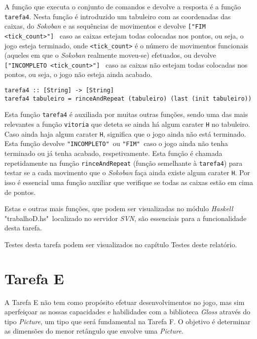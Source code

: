\documentclass[a4paper,12pt]{report}
\begin{document}
A função que executa o conjunto de comandos e devolve a resposta é a função {\footnotesize\tt tarefa4}. Nesta função é introduzido um tabuleiro com as coordenadas das caixas, do {\sl Sokoban} e as sequências de movimentos e devolve {\footnotesize\tt ["FIM <tick\_count>"] } caso as caixas estejam todas colocadas nos pontos, ou seja, o jogo esteja terminado, onde {\footnotesize\tt <tick\_count>} é o número de movimentos funcionais (aqueles em que o {\sl Sokoban} realmente moveu-se) efetuados, ou devolve {\footnotesize\tt ["INCOMPLETO <tick\_count>"] } caso as caixas não estejam todas colocadas nos pontos, ou seja, o jogo não esteja ainda acabado.
\\
\begin{lstlisting}[caption={\small\sl Função {\footnotesize\tt tarefa4} que dado o tabuleiro, as coordenadas das caixas, do Sokoban e uma sequência de movimentos ("UDLR" e.g.) devolve o estado do jogo e o número de movimentos funcionais efetuados.}]
tarefa4 :: [String] -> [String]
tarefa4 tabuleiro = rinceAndRepeat (tabuleiro) (last (init tabuleiro))
\end{lstlisting}

Esta função {\footnotesize\tt tarefa4} é auxiliada por muitas outras funções, sendo uma das mais relevantes a função {\footnotesize\tt vitoria} que deteta se ainda há algum carater {\footnotesize\tt H} no tabuleiro. Caso ainda haja algum carater {\tt H}, significa que o jogo ainda não está terminado. Esta função devolve {\footnotesize\tt "INCOMPLETO" }ou {\footnotesize\tt "FIM" }caso o jogo ainda não tenha terminado ou já tenha acabado, respetivamente. Esta função é chamada repetidamente na função {\footnotesize\tt rinceAndRepeat} (função semelhante à {\footnotesize\tt tarefa4}) para testar se a cada movimento que o {\sl Sokoban} faça ainda existe algum carater {\tt H}. Por isso é essencial uma função auxiliar que verifique se todas as caixas estão em cima de pontos.

Estas e outras mais funções, que podem ser visualizadas no módulo {\sl Haskell} "trabalhoD.hs" localizado no servidor {\sl SVN}, são essenciais para a funcionalidade desta tarefa.

Testes desta tarefa podem ser visualizados no capítulo Testes deste relatório.

\pagebreak







\section{Tarefa E}
A Tarefa E não tem como propósito efetuar desenvolvimentos no jogo, mas sim aperfeiçoar as nossas capacidades e habilidades com a biblioteca {\sl Gloss} através do tipo {\sl Picture}, um tipo que será fundamental na Tarefa F. O objetivo é determinar as dimensões do menor retângulo que envolve uma {\sl Picture}.
\end{document}
